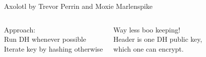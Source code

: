 \documentclass[fleqn,xcolor={usenames,dvipsnames}]{beamer}
\begin{document}
\begin{frame}{Axolotl by Trevor Perrin and Moxie Marlenspike}
\begin{columns}[T]
Approach: \\
\hspace*{2pt} Run DH whenever possible \\
\hspace*{2pt} Iterate key by hashing otherwise 

\medskip
Way less boo keeping! \\
\smallskip
Header is one DH public key, \\
 \hspace*{2pt} which one can encrypt.



\end{columns}
\end{frame}
\end{document}
